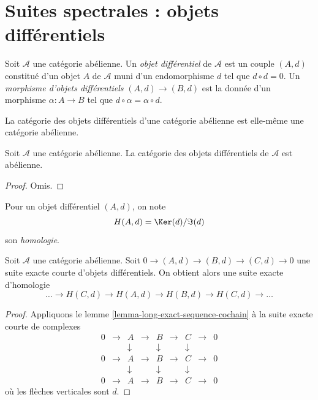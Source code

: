 \section{Suites spectrales : objets différentiels}
\label{section-differential-object}

\begin{definition}
\label{definition-differential-object}
Soit $\mathcal{A}$ une catégorie abélienne.
Un {\it objet différentiel} de $\mathcal{A}$
est un couple $(A, d)$ constitué d'un
objet $A$ de $\mathcal{A}$
muni d'un endomorphisme $d$ tel que $d \circ d = 0$.
Un {\it morphisme d'objets différentiels} $(A, d) \to (B, d)$
est la donnée d'un morphisme $\alpha : A \to B$ tel que
$d \circ \alpha = \alpha \circ d$.
\end{definition}

\begin{lemma}
\label{lemma-differential-objects-abelian}
\begin{slogan}
La catégorie des objets différentiels d'une catégorie abélienne est elle-même
une catégorie abélienne.
\end{slogan}
Soit $\mathcal{A}$ une catégorie abélienne.
La catégorie des objets différentiels de $\mathcal{A}$ est abélienne.
\end{lemma}

\begin{proof}
Omis.
\end{proof}

\begin{definition}
\label{definition-differential-object-homology}
Pour un objet différentiel $(A, d)$, on note
$$
H(A, d) = \Ker(d)/\Im(d)
$$
son {\it homologie}.
\end{definition}

\begin{lemma}
\label{lemma-differential-objects-ses}
Soit $\mathcal{A}$ une catégorie abélienne.
Soit $0 \to (A, d) \to (B, d) \to (C, d) \to 0$ une suite exacte courte
d'objets différentiels. On obtient alors une suite exacte d'homologie
$$
\ldots \to H(C, d) \to H(A, d) \to H(B, d) \to H(C, d) \to \ldots
$$
\end{lemma}

\begin{proof}
Appliquons le lemme \ref{lemma-long-exact-sequence-cochain}
à la suite exacte courte de complexes
$$
\begin{matrix}
0 & \to & A & \to & B & \to & C & \to & 0 \\
& & \downarrow & & \downarrow & & \downarrow \\
0 & \to & A & \to & B & \to & C & \to & 0 \\
& & \downarrow & & \downarrow & & \downarrow \\
0 & \to & A & \to & B & \to & C & \to & 0
\end{matrix}
$$
où les flèches verticales sont $d$.
\end{proof}

